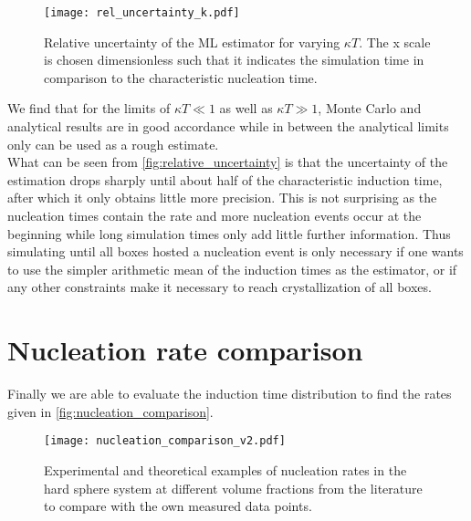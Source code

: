 \begin{figure}[ht]
\begin{center}
\texttt{[image: rel\_uncertainty\_k.pdf]}
\caption[Nucleation rate uncertainty depending on measurement time]{Relative uncertainty of the ML estimator for varying $\kappa T$. The x scale is chosen dimensionless such that it indicates the simulation time in comparison to the characteristic nucleation time.}
\label{fig:relative_uncertainty}
\end{center}
\end{figure}

We find that for the limits of $\kappa T \ll 1$ as well as $\kappa T \gg 1$, Monte Carlo and analytical results are in good accordance while in between the analytical limits only can be used as a rough estimate.\\

What can be seen from \autoref{fig:relative_uncertainty} is that the uncertainty of the estimation drops sharply until about half of the characteristic induction time, after which it only obtains little more precision. This is not surprising as the nucleation times contain the rate and more nucleation events occur at the beginning while long simulation times only add little further information. Thus simulating until all boxes hosted a nucleation event is only necessary if one wants to use the simpler arithmetic mean of the induction times as the estimator, or if any other constraints make it necessary to reach crystallization of all boxes.

\section{Nucleation rate comparison}
\label{sec:nucleation_rates}
Finally we are able to evaluate the induction time distribution to find the rates given in \autoref{fig:nucleation_comparison}.

\begin{figure}[h]
\centering
\texttt{[image: nucleation\_comparison\_v2.pdf]}
\caption[Nucleation rate comparison with literature values]{Experimental and theoretical examples of nucleation rates in the hard sphere system at different volume fractions from the literature\cite{Harland1997,He1996,schaetzel1993,Sinn2001,Auer2001,Filion2010a,Fiorucci2020a,Schilling2011} to compare with the own measured data points.}
\label{fig:nucleation_comparison}
\end{figure}

